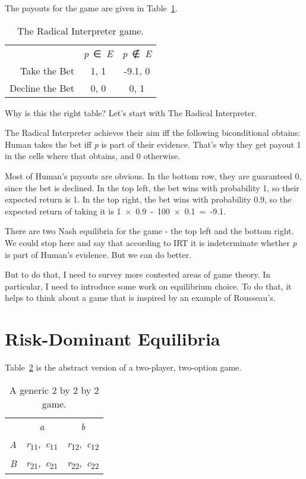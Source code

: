 \documentclass[
  10pt,
  letterpaper,
  twoside]{scrbook}
\begin{document}
The payouts for the game are given in
Table~\ref{tbl-radical-interpreter}.

\begin{longtable}[]{@{}rcc@{}}
\caption{The Radical Interpreter
game.}\label{tbl-radical-interpreter}\tabularnewline
\toprule\noalign{}
\endfirsthead
\endhead
\bottomrule\noalign{}
\endlastfoot
& \emph{p}~∈~\emph{E} & \emph{p}~∉~\emph{E} \\
Take the Bet & 1, 1 & -9.1, 0 \\
Decline the Bet & 0, 0 & 0, 1 \\
\end{longtable}

Why is this the right table? Let's start with The Radical Interpreter.

The Radical Interpreter achieves their aim iff the following
biconditional obtains: Human takes the bet iff \emph{p} is part of their
evidence. That's why they get payout 1 in the cells where that obtains,
and 0 otherwise.

Most of Human's payouts are obvious. In the bottom row, they are
guaranteed 0, since the bet is declined. In the top left, the bet wins
with probability 1, so their expected return is 1. In the top right, the
bet wins with probability 0.9, so the expected return of taking it is
1~×~0.9~-~100~×~0.1~=~-9.1.

There are two Nash equilibria for the game - the top left and the bottom
right. We could stop here and say that according to IRT it is
indeterminate whether \emph{p} is part of Human's evidence. But we can
do better.

But to do that, I need to survey more contested areas of game theory. In
particular, I need to introduce some work on equilibrium choice. To do
that, it helps to think about a game that is inspired by an example of
Rousseau's.

\section{Risk-Dominant Equilibria}\label{sec-globalgame}

Table~\ref{tbl-generic-game} is the abstract version of a two-player,
two-option game.

\begin{longtable}[]{@{}rcc@{}}
\caption{A generic 2 by 2 by 2
game.}\label{tbl-generic-game}\tabularnewline
\toprule\noalign{}
\endfirsthead
\endhead
\bottomrule\noalign{}
\endlastfoot
& \emph{a} & \emph{b} \\
\emph{A} & \emph{r}\textsubscript{11},~\emph{c}\textsubscript{11} &
\emph{r}\textsubscript{12},~\emph{c}\textsubscript{12} \\
\emph{B} & \emph{r}\textsubscript{21},~\emph{c}\textsubscript{21} &
\emph{r}\textsubscript{22},~\emph{c}\textsubscript{22} \\
\end{longtable}
\end{document}
